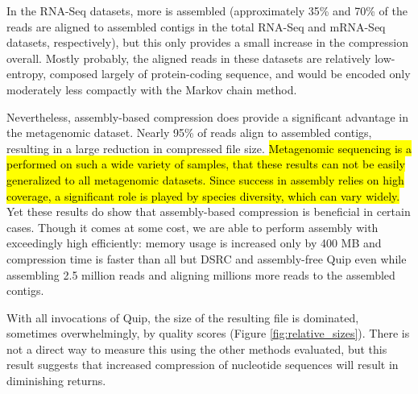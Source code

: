 \documentclass[a4,center,fleqn]{NAR}
\begin{document}
In the RNA-Seq datasets, more is assembled (approximately 35\% and 70\% of the
reads are aligned to assembled contigs in the total RNA-Seq and mRNA-Seq
datasets, respectively), but this only provides a small increase in the
compression overall. Mostly probably, the aligned reads in these datasets are
relatively low-entropy, composed largely of protein-coding sequence, and would
be encoded only moderately less compactly with the Markov chain method.

Nevertheless, assembly-based compression does provide a significant advantage
in the metagenomic dataset. Nearly 95\% of reads align to assembled contigs,
resulting in a large reduction in compressed file size. \hl{Metagenomic sequencing
is a performed on such a wide variety of samples, that these results can not
be easily generalized to all metagenomic datasets. Since success in assembly
relies on high coverage, a significant role is played by species diversity,
which can vary widely.} Yet these results do show that assembly-based
compression is beneficial in certain cases. Though it comes at some cost, we
are able to perform assembly with exceedingly  high efficiently: memory usage
is increased only by 400 MB and compression time is faster than all but DSRC
and assembly-free Quip even while assembling 2.5 million reads and aligning
millions more reads to the assembled contigs.

With all invocations of Quip, the size of the resulting file is dominated,
sometimes overwhelmingly, by quality scores (Figure \ref{fig:relative_sizes}).
There is not a direct way to measure this using the other methods evaluated,
but this result suggests that increased compression of nucleotide sequences
will result in diminishing returns.
\end{document}
